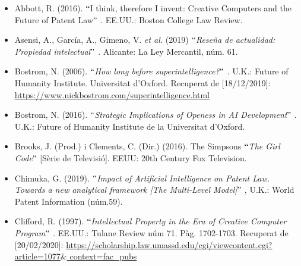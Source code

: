 \documentclass[12pt]{article}
\begin{document}
\vspace{\baselineskip}

\vspace{\baselineskip}
\begin{itemize}
	\item Abbott, R. (2016). $``$I think, therefore I invent: Creative Computers and the Future of Patent Law$"$ . EE.UU.: Boston College Law Review.\par


\vspace{\baselineskip}
	\item Asensi, A., García, A., Gimeno, V. \textit{et al.} (2019)\textit{ $``$Reseña de actualidad: Propiedad intelectual$"$ .} Alicante: La Ley Mercantil, núm. 61.\par


\vspace{\baselineskip}
	\item Bostrom, N. (2006). \textit{$``$How long before superintelligence?$"$ .} U.K.: Future of Humanity Institute. Universitat d’Oxford. Recuperat de [18/12/2019]: \href{https://www.nickbostrom.com/superintelligence.html}{\textcolor[HTML]{0000FF}{\ul{https://www.nickbostrom.com/superintelligence.html}}}\par


\vspace{\baselineskip}
	\item Bostrom, N. (2016). \textit{$``$Strategic Implications of Openess in AI Development$"$ }. U.K.: Future of Humanity Institute de la Universitat d’Oxford.\par


\vspace{\baselineskip}
	\item Brooks, J. (Prod.) i Clements, C. (Dir.) (2016). The Simpsons $``$\textit{The Girl Code}$"$  [Sèrie de Televisió]. EEUU: 20th Century Fox Television.\par


\vspace{\baselineskip}
	\item Chimuka, G. (2019). \textit{$``$Impact of Artificial Intelligence on Patent Law. Towards a new analytical framework [The Multi-Level Model]$"$ }, U.K.: World Patent Information (núm.59). \par


\vspace{\baselineskip}
	\item Clifford, R. (1997). \textit{$``$Intellectual Property in the Era of Creative Computer Program$"$ . }EE.UU.: Tulane Review núm 71. Pàg. 1702-1703. Recuperat de [20/02/2020]: \href{https://scholarship.law.umassd.edu/cgi/viewcontent.cgi?article=1077&context=fac_pubs}{https://scholarship.law.umassd.edu/cgi/viewcontent.cgi?article=1077$\&$ context=fac\_pubs}\par



\end{itemize}
\end{document}
